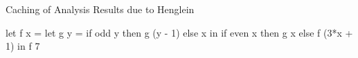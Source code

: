 \documentclass{haskellbeamer}
\begin{document}
\begin{frame}[fragile]{Caching of Analysis Results due to Henglein}
  \begin{center}
    \begin{minipage}{0.8\textwidth}
      \begin{haskell}
        let f x =
              let g y = 
                    if odd y 
                      then g (y - 1) 
                      else x
              in if even x 
                  then g x 
                  else f (3*x + 1)
        in f 7
      \end{haskell}
    \end{minipage}
  \end{center}
\end{frame}
\end{document}
